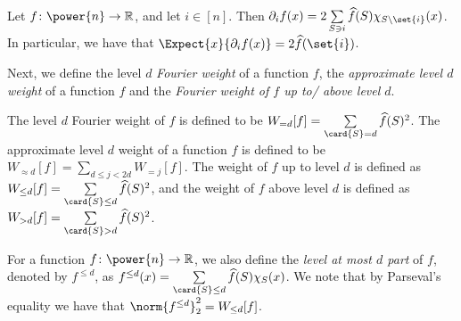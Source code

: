 \begin{fact}\label{fact:singeton}
  Let $f\colon\power{n}\to\mathbb{R}$, and let $i\in[n]$.
  Then $\partial_i f(x) =
  2\sum\limits_{S\ni i}{\widehat{f}(S)\chi_{S\setminus \set{i}}(x)}$.
  In particular, we have that $\Expect{x}{\partial_i f(x)} = 2\widehat{f}(\set{i})$.
\end{fact}


Next, we define the level $d$ \emph{Fourier weight} of a function $f$, the \emph{approximate level $d$ weight} of a function $f$
and the \emph{Fourier weight of $f$ up to/ above level $d$}.
\begin{definition}
  The level $d$ Fourier weight of $f$ is defined to be $W_{=d}[f] = \sum\limits_{\card{S} = d}{\widehat{f}(S)^2}$. The
  approximate level $d$ weight of a function $f$ is defined to be $W_{\approx d}[f] = \sum\limits_{d\leq j<2d}{W_{=j}[f]}$.
  The weight of $f$ up to level $d$ is defined as $W_{\leq d}[f] = \sum\limits_{\card{S}\leq d}{\widehat{f}(S)^2}$,
  and the weight of $f$ above level $d$ is defined as $W_{> d}[f] = \sum\limits_{\card{S}> d}{\widehat{f}(S)^2}$.
\end{definition}
For a function $f\colon\power{n}\to\mathbb{R}$, we also define the \emph{level at most $d$ part} of $f$, denoted by $f^{\leq d}$,
as $f^{\leq d}(x) = \sum\limits_{\card{S}\leq d} \widehat{f}(S)\chi_S(x)$. We note that by Parseval's equality we have that
$\norm{f^{\leq d}}_2^2 = W_{\leq d}[f]$.
